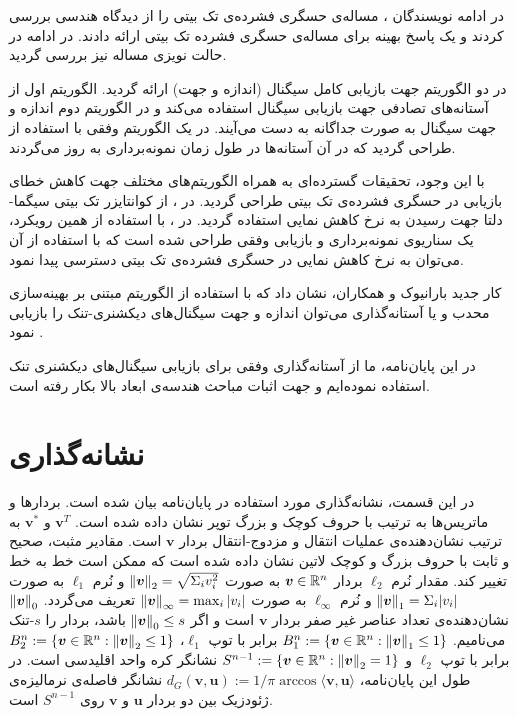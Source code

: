 در ادامه نویسندگان
\cite{plan2013one}
، مساله‌ی حسگری فشرده‌ی تک بیتی را از دیدگاه هندسی بررسی کردند و یک پاسخ بهینه برای مساله‌ی حسگری فشرده تک بیتی ارائه دادند. در ادامه در 
\cite{plan2013robust}
حالت نویزی مساله نیز بررسی گردید.

در 
\cite{knudson2016one}
دو الگوریتم جهت بازیابی کامل سیگنال (اندازه و جهت)‌ ارائه گردید.  الگوریتم اول از آستانه‌های تصادفی جهت بازیابی سیگنال استفاده می‌کند و در الگوریتم دوم اندازه و جهت سیگنال به صورت جداگانه به دست می‌آیند. در 
\cite{kamilov2012one}
یک الگوریتم وفقی با استفاده از 
طراحی گردید که در آن آستانه‌ها در طول زمان نمونه‌برداری به روز می‌گردند.

با این وجود، تحقیقات گسترده‌ای به همراه الگوریتم‌های مختلف جهت کاهش خطای بازیابی در حسگری فشرده‌ی تک بیتی طراحی گردید.  در  
\cite{Guentuerk2003}
، از کوانتایزر تک بیتی سیگما-دلتا جهت رسیدن به نرخ کاهش نمایی استفاده گردید. در  
\cite{baraniuk2017exponential}،
با استفاده از همین رویکرد، یک سناریوی نمونه‌برداری و بازیابی وفقی طراحی شده است که با استفاده از آن می‌توان به نرخ کاهش نمایی  در حسگری فشرده‌ی تک بیتی دسترسی پیدا نمود.

کار جدید بارانیوک
و همکاران، نشان داد که با استفاده از الگوریتم مبتنی بر بهینه‌سازی محدب و یا آستانه‌گذاری می‌توان اندازه و جهت سیگنال‌های دیکشنری-تنک را بازیابی نمود
\cite{Baraniuk2017}.

در این پایان‌نامه، ما از آستانه‌گذاری وفقی برای بازیابی سیگنال‌های دیکشنری تنک استفاده نموده‌ایم و جهت اثبات مباحث هندسه‌ی ابعاد بالا بکار رفته است.

\section{نشانه‌گذاری}
در این قسمت، نشانه‌گذاری مورد استفاده در پایان‌نامه بیان شده است.
بردار‌ها و ماتریس‌ها به ترتیب با حروف کوچک و بزرگ توپر نشان داده شده است. 
 $ \bm{v}^T $ 
 و
 $ \bm{v}^{\ast} $
به ترتیب نشان‌دهنده‌ی عملیات انتقال و مزدوج-انتقال بردار 
$ \bm{v} $
است. مقادیر مثبت، صحیح و ثابت با حروف بزرگ و کوچک لاتین نشان داده شده است که ممکن است خط به خط تغییر کند.
مقدار نُرم 
$\ell_2$ 
بردار
$ \bm{v} \in \mathbb{R}^n $
به صورت
$ \left\lVert\bm{v}\right\rVert_2= \sqrt{\Sigma_i v_i^2} $
و نُرم 
$\ell_1$ 
به صورت
 $ \left\lVert\bm{v}\right\rVert_1= \Sigma_i |v_i|$
و نُرم
$ \ell_{\infty} $
به صورت
$ \left\lVert\bm{v}\right\rVert_{\infty}= \max_{i} |v_{i}| $
 تعریف می‌گردد.
  $ \left\lVert\bm{v}\right\rVert_0 $
 نشان‌دهنده‌ی تعداد عناصر غیر صفر بردار
 $ \bm{v} $
 است و اگر
 $ \left\lVert\bm{v}\right\rVert_0 \leq s$
 باشد،  بردار را
$s$-تنک
می‌نامیم. 
$ B_1^n := \{\bm{v}\in \mathbb{R}^n : \left\lVert\bm{v}\right\rVert_{1}\leq 1 \} $ 
برابر با توپ $ \ell_1 $، 
$ B_2^n := \{\bm{v}\in \mathbb{R}^n : \left\lVert\bm{v}\right\rVert_{2}\leq 1 \} $
برابر با توپ $ \ell_2 $ و 
$ S^{n-1}:= \{\bm{v}\in \mathbb{R}^n : \left\lVert\bm{v}\right\rVert_{2}= 1 \} $
نشانگر کره واحد اقلیدسی است.
در طول این پایان‌نامه،
 $ d_{G}\left(\bm{v},\bm{u}\right):=1/\pi \arccos\langle \bm{v},\bm{u} \rangle $
نشانگر فاصله‌ی نرمالیزه‌ی ژئودزیک
بین دو بردار 
$ \bm{u} $
و
$ \bm{v}$
روی 
$ S^{n-1} $ 
است. 

